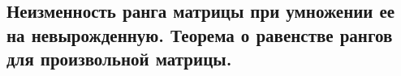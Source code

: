 {
\subsection{Неизменность ранга матрицы при умножении ее на невырожденную. Теорема о равенстве рангов для произвольной матрицы.}
}